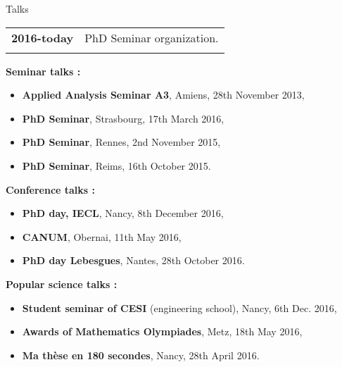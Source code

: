 \documentclass[10pt,a4paper]{report}
\begin{document}
\vspace{1cm}
\noindent
{\selectfont
\begin{Large}
Talks
\end{Large}
\hrulefill
}

\vspace{0.6cm}
\noindent
\begin{center}
\begin{tabular}{r p{12cm}}
\textbf{2016-today} & PhD Seminar organization.\\

& \\

\end{tabular}
\end{center}


\vspace{0.4cm}
\noindent
{\selectfont
\textbf{Seminar talks :}
}

\begin{itemize}
\item \textbf{Applied Analysis Seminar A3}, Amiens, 28th November 2013,
\item \textbf{PhD Seminar}, Strasbourg, 17th March 2016,
\item \textbf{PhD Seminar}, Rennes, 2nd November 2015,
\item \textbf{PhD Seminar}, Reims, 16th October 2015.
\end{itemize}

\vspace{0.4cm}
\noindent
{\selectfont
\textbf{Conference talks :}
}

\begin{itemize}
\item \textbf{PhD day, IECL}, Nancy, 8th December 2016,
\item \textbf{CANUM}, Obernai, 11th May 2016,
\item \textbf{PhD day Lebesgues}, Nantes, 28th October 2016.
\end{itemize}

\vspace{0.4cm}
\noindent
{\selectfont
\textbf{Popular science talks :}
}
\begin{itemize}
\item \textbf{Student seminar of CESI }(engineering school), Nancy, 6th Dec. 2016,
\item \textbf{Awards of Mathematics Olympiades}, Metz, 18th May 2016,
\item \textbf{Ma thèse en 180 secondes}, Nancy, 28th April 2016.
\end{itemize}
\end{document}

